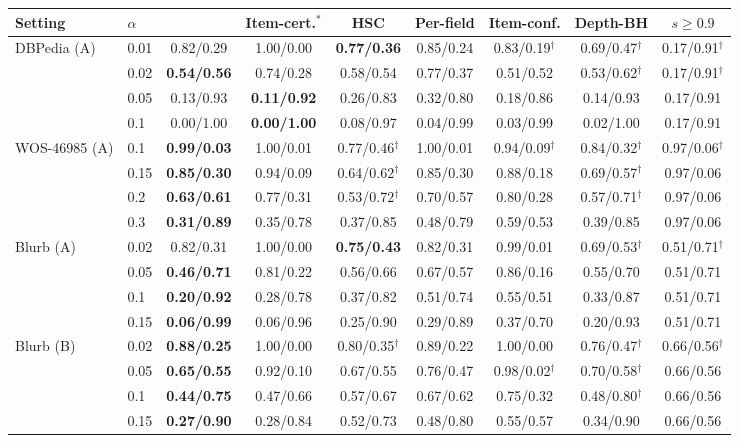 \begin{tabular}{llccccccc}
\toprule
Setting & $\alpha$ & \hlcl{} & Item-cert.$^\ast$ & HSC & Per-field & Item-conf. & Depth-BH & $s\ge0.9$ \\
\midrule
DBPedia (A) & 0.01 & 0.82/0.29 & 1.00/0.00 & \textbf{0.77/0.36} & 0.85/0.24 & 0.83/0.19$^\dagger$ & 0.69/0.47$^\dagger$ & 0.17/0.91$^\dagger$ \\
 & 0.02 & \textbf{0.54/0.56} & 0.74/0.28 & 0.58/0.54 & 0.77/0.37 & 0.51/0.52 & 0.53/0.62$^\dagger$ & 0.17/0.91$^\dagger$ \\
 & 0.05 & 0.13/0.93 & \textbf{0.11/0.92} & 0.26/0.83 & 0.32/0.80 & 0.18/0.86 & 0.14/0.93 & 0.17/0.91 \\
 & 0.1 & 0.00/1.00 & \textbf{0.00/1.00} & 0.08/0.97 & 0.04/0.99 & 0.03/0.99 & 0.02/1.00 & 0.17/0.91 \\
\midrule
WOS-46985 (A) & 0.1 & \textbf{0.99/0.03} & 1.00/0.01 & 0.77/0.46$^\dagger$ & 1.00/0.01 & 0.94/0.09$^\dagger$ & 0.84/0.32$^\dagger$ & 0.97/0.06$^\dagger$ \\
 & 0.15 & \textbf{0.85/0.30} & 0.94/0.09 & 0.64/0.62$^\dagger$ & 0.85/0.30 & 0.88/0.18 & 0.69/0.57$^\dagger$ & 0.97/0.06 \\
 & 0.2 & \textbf{0.63/0.61} & 0.77/0.31 & 0.53/0.72$^\dagger$ & 0.70/0.57 & 0.80/0.28 & 0.57/0.71$^\dagger$ & 0.97/0.06 \\
 & 0.3 & \textbf{0.31/0.89} & 0.35/0.78 & 0.37/0.85 & 0.48/0.79 & 0.59/0.53 & 0.39/0.85 & 0.97/0.06 \\
\midrule
Blurb (A) & 0.02 & 0.82/0.31 & 1.00/0.00 & \textbf{0.75/0.43} & 0.82/0.31 & 0.99/0.01 & 0.69/0.53$^\dagger$ & 0.51/0.71$^\dagger$ \\
 & 0.05 & \textbf{0.46/0.71} & 0.81/0.22 & 0.56/0.66 & 0.67/0.57 & 0.86/0.16 & 0.55/0.70 & 0.51/0.71 \\
 & 0.1 & \textbf{0.20/0.92} & 0.28/0.78 & 0.37/0.82 & 0.51/0.74 & 0.55/0.51 & 0.33/0.87 & 0.51/0.71 \\
 & 0.15 & \textbf{0.06/0.99} & 0.06/0.96 & 0.25/0.90 & 0.29/0.89 & 0.37/0.70 & 0.20/0.93 & 0.51/0.71 \\
\midrule
Blurb (B) & 0.02 & \textbf{0.88/0.25} & 1.00/0.00 & 0.80/0.35$^\dagger$ & 0.89/0.22 & 1.00/0.00 & 0.76/0.47$^\dagger$ & 0.66/0.56$^\dagger$ \\
 & 0.05 & \textbf{0.65/0.55} & 0.92/0.10 & 0.67/0.55 & 0.76/0.47 & 0.98/0.02$^\dagger$ & 0.70/0.58$^\dagger$ & 0.66/0.56 \\
 & 0.1 & \textbf{0.44/0.75} & 0.47/0.66 & 0.57/0.67 & 0.67/0.62 & 0.75/0.32 & 0.48/0.80$^\dagger$ & 0.66/0.56 \\
 & 0.15 & \textbf{0.27/0.90} & 0.28/0.84 & 0.52/0.73 & 0.48/0.80 & 0.55/0.57 & 0.34/0.90 & 0.66/0.56 \\
\bottomrule
\end{tabular}
